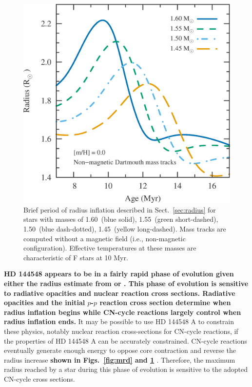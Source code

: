 \documentclass{aa}
\begin{document}
\begin{figure}[t]
    \centering
    \includegraphics[width=0.85\linewidth]{radius_bump.eps}
    \caption{Brief period of radius inflation described in Sect.~\ref{sec:radius} for stars with masses of 1.60\msun\ (blue solid), 1.55\msun\ (green short-dashed), 1.50\msun\ (blue dash-dotted), 1.45\msun\ (yellow long-dashed). Mass tracks are computed without a magnetic field (i.e., non-magnetic configuration). Effective temperatures at these masses are characteristic of F stars at 10 Myr.}
    \label{fig:bump}
\end{figure}

{\bf HD 144548 appears to be in a fairly rapid phase of evolution given either the radius estimate from \cite{Pecaut2012} or \citet{Alonso2015}. This phase of evolution is sensitive to radiative opacities and nuclear reaction cross sections. Radiative opacities and the initial $p$-$p$ reaction cross section determine when radius inflation begins while CN-cycle reactions largely control when radius inflation ends.} It may be possible to use HD 144548 A to constrain these physics, notably nuclear reaction cross-sections for CN-cycle reactions, if the properties of HD 144548 A can be accurately constrained. CN-cycle reactions eventually generate enough energy to oppose core contraction and reverse the radius increase {\bf shown in Figs.\ \ref{fig:mrd} and \ref{fig:bump} \citep[also see][]{Stassun2014}}. Therefore, the maximum radius reached by a star during this phase of evolution is sensitive to the adopted CN-cycle cross sections. 
\end{document}
